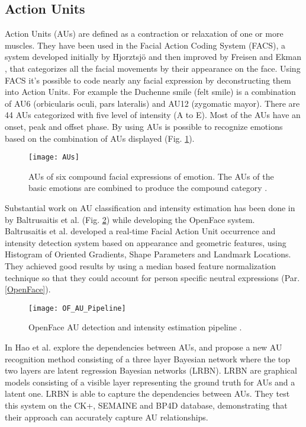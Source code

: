 \subsection{Action Units} \label{au}
Action Units (AUs) are defined as a contraction or relaxation of one or more muscles. They have been used in the Facial Action Coding System (FACS), a system developed initially by Hjorztsjö \cite{facsCH} and then improved by Freisen and Ekman \cite{facs1978}, that categorizes all the facial movements by their appearance on the face. Using FACS it's possible to code nearly any facial expression by deconstructing them into Action Units. For example the Duchenne smile (felt smile) is a combination of AU6 (orbicularis oculi, pars lateralis) and AU12 (zygomatic mayor).
There are 44 AUs categorized with five level of intensity (A to E). Most of the AUs have an onset, peak and offset phase.
By using AUs is possible to recognize emotions based on the combination of AUs displayed (Fig. \ref{fig:AUs}).\\

\begin{figure}[H]
	\centering
	\texttt{[image: AUs]}
	\caption{AUs of six compound facial expressions of emotion. The AUs of the basic emotions are combined to produce the compound category \cite{Du2014CompoundFE}.}
	\label{fig:AUs}
\end{figure}

Substantial work on AU classification and intensity estimation has been done in \cite{Baltru2015} by Baltrusaitis et al. (Fig. \ref{fig:OF_AU_pipeline}) while developing the OpenFace \cite{Baltru2016} system. \\
Baltrusaitis et al. developed a real-time Facial Action Unit occurrence and intensity detection system based on appearance and geometric features, using Histogram of Oriented Gradients, Shape Parameters and Landmark Locations. They achieved good results by using a median based feature normalization technique so that they could account for person specific neutral expressions (Par. \ref{OpenFace}).\\

\begin{figure}[H]
	\centering
	\texttt{[image: OF\_AU\_Pipeline]}
	\caption{OpenFace AU detection and intensity estimation pipeline \cite{Baltru2015}.}
	\label{fig:OF_AU_pipeline}
\end{figure}

In \cite{HaoWangAU} Hao et al. explore the dependencies between AUs, and propose a new AU recognition method consisting of a three layer Bayesian network where the top two layers are latent regression Bayesian networks (LRBN). LRBN are graphical models consisting of a visible layer representing the ground truth for AUs and a latent one. LRBN is able to capture the dependencies between AUs. They test this system on the CK+, SEMAINE and BP4D database, demonstrating that their approach can accurately capture AU relationships.\\

